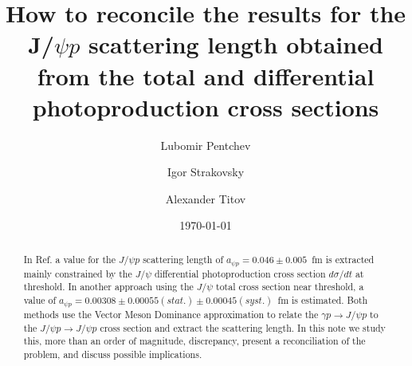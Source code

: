 \documentclass[%
preprint,
nofootinbib,
 amsmath,amssymb,
 aps,
floatfix,
]{revtex4-1}
\begin{document}

\title{How to reconcile the results for the J/$\psi p$ scattering length obtained from 
the total and differential photoproduction cross sections}%
\author{Lubomir Pentchev}
\author{Igor Strakovsky}
\author{Alexander Titov}
%



\date{\today}%

\begin{abstract}
In Ref. \cite{Vanderhaeghen_jpsi}
a value for the $J/\psi p$ scattering length of
$a_{\psi p} = 0.046 \pm 0.005$~fm is extracted
mainly constrained by the $J/\psi $ differential
photoproduction cross section $d\sigma/dt$ at threshold.
In another approach \cite{Strakovsky_jpsi} using the $J/\psi $ total cross section near threshold,
a value of $a_{\psi p} = 0.00308 \pm 0.00055(stat.) \pm 0.00045(syst.)$~fm is estimated.
Both methods use the Vector Meson Dominance approximation to relate the $\gamma p \to J/\psi p$ to the
$J/\psi p \to J/\psi p$ cross section and extract the scattering length.
In this note we study this, more than an order of magnitude, discrepancy,
present a reconciliation of the problem, 
and discuss possible implications.
\end{abstract}

\maketitle
\end{document}
